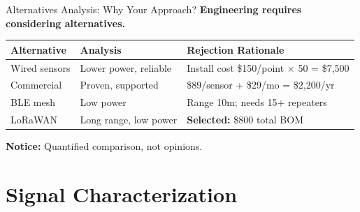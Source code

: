 \documentclass[aspectratio=169,11pt]{beamer}
\begin{document}
\begin{frame}{Alternatives Analysis: Why Your Approach?}
    \textbf{Engineering requires considering alternatives.}
    
    \vspace{0.3cm}
    \begin{table}
        \centering
        \small
        \begin{tabular}{@{}p{2.5cm}p{4.5cm}p{5.5cm}@{}}
            \toprule
            \textbf{Alternative} & \textbf{Analysis} & \textbf{Rejection Rationale} \\
            \midrule
            Wired sensors & Lower power, reliable & Install cost \$150/point $\times$ 50 = \$7,500 \\
            \addlinespace
            Commercial & Proven, supported & \$89/sensor + \$29/mo = \$2,200/yr \\
            \addlinespace
            BLE mesh & Low power & Range 10m; needs 15+ repeaters \\
            \addlinespace
            LoRaWAN & Long range, low power & \textbf{Selected:} \$800 total BOM \\
            \bottomrule
        \end{tabular}
    \end{table}
    
    \vspace{0.2cm}
    \textbf{Notice:} Quantified comparison, not opinions.
\end{frame}

\section{Signal Characterization}
\end{document}
